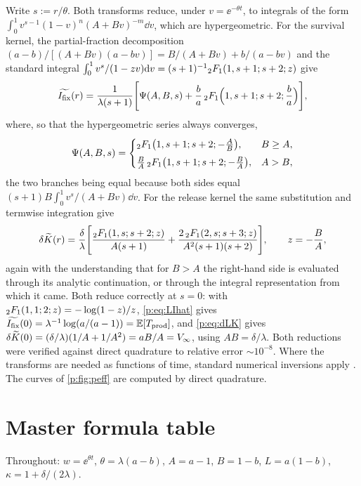 Write $s:=r/\theta$. Both transforms reduce, under $v=\ee^{-\theta t}$, to
integrals of the form $\int_0^1 v^{s-1}(1-v)^n(A+Bv)^{-m}\dd v$, which are
hypergeometric. For the survival kernel, the partial-fraction decomposition
$(a-b)/[(A+Bv)(a-bv)]=B/(A+Bv)+b/(a-bv)$ and the standard integral
$\int_0^1 v^s/(1-zv)\mathrm{d} v=(s+1)^{-1}{}_2F_1(1,s+1;s+2;z)$ give
\begin{equation}
\widetilde{I_{\mathrm{fix}}}(r)=\frac{1}{\lambda(s+1)}
\Biggl[
\Psi(A,B,s)
+\frac{b}{a}\,{}_2F_1\Bigl(1,s+1;s+2;\frac{b}{a}\Bigr)
\Biggr],
\label{p:eq:LIhat}
\end{equation}
where, so that the hypergeometric series always converges,
\begin{equation}
\Psi(A,B,s)=
\begin{cases}
{}_2F_1\bigl(1,s+1;s+2;-\frac{A}{B}\bigr), & B\ge A,\\[0.4em]
\frac{B}{A}\,{}_2F_1\bigl(1,s+1;s+2;-\frac{B}{A}\bigr), & A>B,
\end{cases}
\label{p:eq:Psi}
\end{equation}
the two branches being equal because both sides equal
$(s+1)B\int_0^1 v^s/(A+Bv)\dd v$. For the release kernel the same
substitution and termwise integration give
\begin{equation}
\delta\widetilde{K}(r)=\frac{\delta}{\lambda}
\Biggl[
\frac{{}_2F_1(1,s;s+2;z)}{A(s+1)}
+\frac{2\,{}_2F_1(2,s;s+3;z)}{A^2(s+1)(s+2)}
\Biggr],
\qquad z=-\frac{B}{A},
\label{p:eq:dLK}
\end{equation}
again with the understanding that for $B>A$ the right-hand side is evaluated
through its analytic continuation, or through the integral representation
from which it came. Both reduce correctly at $s=0$: with
${}_2F_1(1,1;2;z)=-\log(1-z)/z$, \cref{p:eq:LIhat} gives
$\widetilde{I_{\mathrm{fix}}}(0)=\lambda^{-1}\log(a/(a-1))=\mathbb{E}\!\left[T_{\rm prod}\right]$, and
\cref{p:eq:dLK} gives $\delta\widetilde{K}(0)=(\delta/\lambda)(1/A+1/A^2)=aB/A
=V_\infty$, using $AB=\delta/\lambda$. Both reductions were verified against
direct quadrature to relative error $\sim10^{-8}$. Where the transforms are
needed as functions of time, standard numerical inversions apply
\cite{stehfest1970algorithm,gaver1965observations}. The curves of
\cref{p:fig:peff} are computed by direct quadrature.

\section{Master formula table}
\label{p:app:formulae}

Throughout: $w=\ee^{\theta t}$, $\theta=\lambda(a-b)$, $A=a-1$, $B=1-b$,
$L=a(1-b)$, $\kappa=1+\delta/(2\lambda)$.

